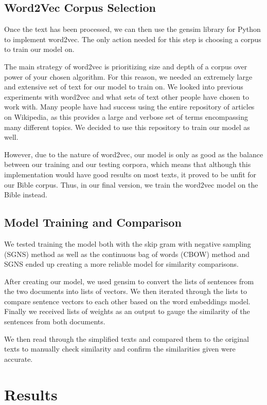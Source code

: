\documentclass[11pt]{article}
\begin{document}
\subsection{Word2Vec Corpus Selection}
Once the text has been processed, we can then use the gensim library for Python to implement word2vec. The only action needed for this step is choosing a corpus to train our model on. 

The main strategy of word2vec is prioritizing size and depth of a corpus over power of your chosen algorithm. For this reason, we needed an extremely large and extensive set of text for our model to train on. We looked into previous experiments with word2vec and what sets of text other people have chosen to work with. Many people have had success using the entire repository of articles on Wikipedia, as this provides a large and verbose set of terms encompassing many different topics. We decided to use this repository to train our model as well.

However, due to the nature of word2vec, our model is only as good as the balance between our training and our testing corpora, which means that although this implementation would have good results on most texts, it proved to be unfit for our Bible corpus. Thus, in our final version, we train the word2vec model on the Bible instead. 
\subsection{Model Training and Comparison}
We tested training the model both with the skip gram with negative sampling (SGNS) method as well as the continuous bag of words (CBOW) method and SGNS ended up creating a more reliable model for similarity comparisons. 

After creating our model, we used gensim to convert the lists of sentences from the two documents into lists of vectors. We then iterated through the lists to compare sentence vectors to each other based on the word embeddings model. Finally we received lists of weights as an output to gauge the similarity of the sentences from both documents. 

We then read through the simplified texts and compared them to the original texts to manually check similarity and confirm the similarities given were accurate. 

\section{Results}
\end{document}
